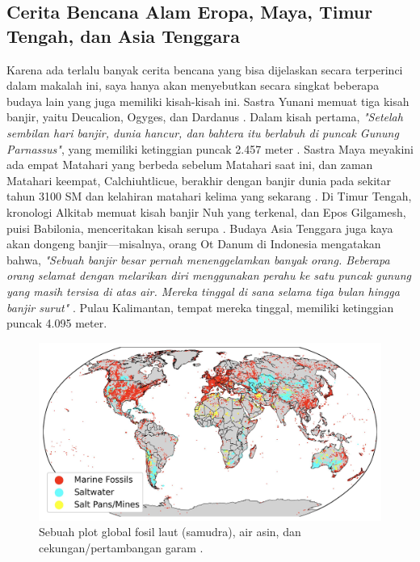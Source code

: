 \documentclass[10pt,twocolumn,letterpaper]{article}
\begin{document}
\subsection{Cerita Bencana Alam Eropa, Maya, Timur Tengah, dan Asia Tenggara}

Karena ada terlalu banyak cerita bencana yang bisa dijelaskan secara terperinci dalam makalah ini, saya hanya akan menyebutkan secara singkat beberapa budaya lain yang juga memiliki kisah-kisah ini. Sastra Yunani memuat tiga kisah banjir, yaitu Deucalion, Ogyges, dan Dardanus \cite{9,10}. Dalam kisah pertama, \textit{"Setelah sembilan hari banjir, dunia hancur, dan bahtera itu berlabuh di puncak Gunung Parnassus"}, yang memiliki ketinggian puncak 2.457 meter \cite{11}. Sastra Maya meyakini ada empat Matahari yang berbeda sebelum Matahari saat ini, dan zaman Matahari keempat, Calchiuhtlicue, berakhir dengan banjir dunia pada sekitar tahun 3100 SM dan kelahiran matahari kelima yang sekarang \cite{12}. Di Timur Tengah, kronologi Alkitab memuat kisah banjir Nuh yang terkenal, dan Epos Gilgamesh, puisi Babilonia, menceritakan kisah serupa \cite{13}. Budaya Asia Tenggara juga kaya akan dongeng banjir—misalnya, orang Ot Danum di Indonesia mengatakan bahwa, \textit{"Sebuah banjir besar pernah menenggelamkan banyak orang. Beberapa orang selamat dengan melarikan diri menggunakan perahu ke satu puncak gunung yang masih tersisa di atas air. Mereka tinggal di sana selama tiga bulan hingga banjir surut"} \cite{3}. Pulau Kalimantan, tempat mereka tinggal, memiliki ketinggian puncak 4.095 meter.

\begin{figure}[b]
\begin{center}
\includegraphics[width=1\textwidth]{marine.jpg}
\end{center}
   \caption{Sebuah plot global fosil laut (samudra), air asin, dan cekungan/pertambangan garam \cite{15,16,86,87}.}
   \label{fig:2}
\end{figure}
\end{document}
